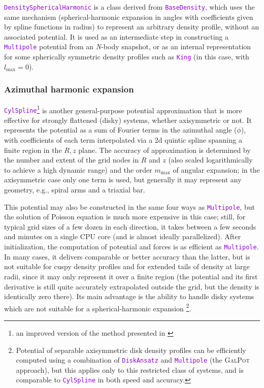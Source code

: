 \documentclass[12pt]{article}
\newcommand{\Nbody}{\textsl{N}-body\xspace}
\newcommand{\ttt}[1]{\textcolor{darkviolet}{\texttt{#1}}}
\begin{document}
\ttt{DensitySphericalHarmonic} is a class derived from \ttt{BaseDensity}, which uses the same mechanism (spherical-harmonic expansion in angles with coefficients given by spline functions in radius) to represent an arbitrary density profile, without an associated potential. It is used as an intermediate step in constructing a \ttt{Multipole} potential from an \Nbody snapshot, or as an internal representation for some spherically symmetric density profiles such as \ttt{King} (in this case, with $l_\mathrm{max}=0$).

\subsubsection{Azimuthal harmonic expansion}  \label{sec:PotentialCylSpline}

\ttt{CylSpline}\footnote{an improved version of the method presented in \cite{VasilievAthanassoula2015}} is another general-purpose potential approximation that is more effective for strongly flattened (disky) systems, whether axisymmetric or not. It represents the potential as a sum of Fourier terms in the azimuthal angle ($\phi$), with coefficients of each term interpolated via a 2d quintic spline spanning a finite region in the $R,z$ plane. The accuracy of approximation is determined by the number and extent of the grid nodes in $R$ and $z$ (also scaled logarithmically to achieve a high dynamic range) and the order $m_\mathrm{max}$ of angular expansion; in the axisymmetric case only one term is used, but generally it may represent any geometry, e.g., spiral arms and a triaxial bar.

This potential may also be constructed in the same four ways as \ttt{Multipole}, but the solution of Poisson equation is much more expensive in this case; still, for typical grid sizes of a few dozen in each direction, it takes between a few seconds and minutes on a single CPU core (and is almost ideally parallelized). After initialization, the computation of potential and forces is as efficient as \ttt{Multipole}. In many cases, it delivers comparable or better accuracy than the latter, but is not suitable for cuspy density profiles and for extended tails of density at large radii, since it may only represent it over a finite region (the potential and its first derivative is still quite accurately extrapolated outside the grid, but the density is identically zero there). Its main advantage is the ability to handle disky systems which are not suitable for a spherical-harmonic expansion%
\footnote{Potential of separable axisymmetric disk density profiles can be efficiently computed using a combination of \ttt{DiskAnsatz} and \ttt{Multipole} (the \textsc{GalPot} approach), but this applies only to this restricted class of systems, and is comparable to \ttt{CylSpline} in both speed and accuracy.}.
\end{document}

